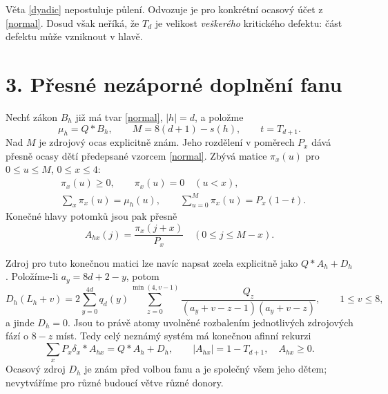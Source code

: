 \documentclass[11pt,a4paper]{article}
\begin{document}
Věta \ref{dyadic} nepostuluje půlení. Odvozuje je pro konkrétní ocasový
účet z \eqref{normal}. Dosud však neříká, že $T_d$ je velikost
\emph{veškerého} kritického defektu: část defektu může vzniknout v hlavě.

\section*{3. Přesné nezáporné doplnění fanu}
Nechť zákon $B_h$ již má tvar \eqref{normal}, $|h|=d$, a položme
\[
 \mu_h=Q*B_h,\qquad M=8(d+1)-s(h),\qquad t=T_{d+1}.
\]
Nad $M$ je zdrojový ocas explicitně znám. Jeho rozdělení v poměrech
$P_x$ dává přesně ocasy dětí předepsané vzorcem \eqref{normal}.
Zbývá matice $\pi_x(u)$ pro $0\le u\le M$, $0\le x\le4$:
\begin{align}
 &\pi_x(u)\ge0,\qquad \pi_x(u)=0\quad(u<x),\label{pos}\\
 &\sum_x\pi_x(u)=\mu_h(u),\qquad
   \sum_{u=0}^M\pi_x(u)=P_x(1-t).\label{rows}
\end{align}
Konečné hlavy potomků jsou pak přesně
\begin{equation}\label{head}
 A_{hx}(j)=\frac{\pi_x(j+x)}{P_x}\quad(0\le j\le M-x).
\end{equation}

Zdroj pro tuto konečnou matici lze navíc napsat zcela explicitně jako
$Q*A_h+D_h$. Položíme-li $a_y=8d+2-y$, potom
\begin{equation}\label{birth}
 D_h(L_h+v)=
 2\sum_{y=0}^{4d}q_d(y)
   \sum_{z=0}^{\min(4,v-1)}
 \frac{Q_z}{(a_y+v-z-1)(a_y+v-z)},\qquad 1\le v\le8,
\end{equation}
a jinde $D_h=0$. Jsou to právě atomy uvolněné rozbalením jednotlivých
zdrojových fází o $8-z$ míst. Tedy celý neznámý systém má konečnou
afinní rekurzi
\begin{equation}\label{affine}
 \boxed{\sum_xP_x\delta_x*A_{hx}=Q*A_h+D_h,\qquad
 |A_{hx}|=1-T_{d+1},\quad A_{hx}\ge0.}
\end{equation}
Ocasový zdroj $D_h$ je znám před volbou fanu a je společný všem jeho
dětem; nevytváříme pro různé budoucí větve různé donory.
\end{document}
